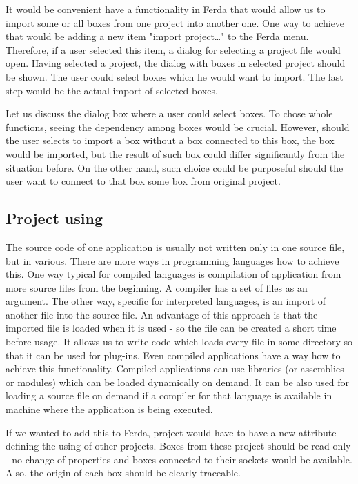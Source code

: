 \documentclass[a4paper,12pt]{book}
\begin{document}
It would be convenient have a functionality in Ferda that would allow us to import some or all boxes from one project into another one. One way to achieve that would be adding a new item "import project\dots" to the Ferda menu. Therefore, if a user selected this item, a dialog for selecting a project file would open. Having selected a project, the dialog with boxes in selected project should be shown. The user could select boxes which he would want to import. The last step would be the actual import of selected boxes.

Let us discuss the dialog box where a user could select boxes. To chose whole functions, seeing the dependency among boxes would be crucial. However, should the user selects to import a box without a box connected to this box, the box would be imported, but the result of such box could differ significantly from the situation before. On the other hand, such choice could be purposeful should the user want to connect to that box some box from original project.


\subsection{Project using}
The source code of one application is usually not written only in one source file, but in various. There are more ways in programming languages how to achieve this. One way typical for compiled languages is compilation of application from more source files from the beginning. A compiler has a set of files as an argument. The other way, specific for interpreted languages, is an import of another file into the source file. An advantage of this approach is that the imported file is loaded when it is used - so the file can be created a short time before usage. It allows us to write code which loads every file in some directory so that it can be used for plug-ins. Even compiled applications have a way how to achieve this functionality. Compiled applications can use libraries (or assemblies or modules) which can be loaded dynamically on demand. It can be also used for loading a source file on demand if a compiler for that language is available in machine where the application is being executed.

If we wanted to add this to Ferda, project would have to have a new attribute defining the using of other projects. Boxes from these project should be read only - no change of properties and boxes connected to their sockets would be available. Also, the origin of each box should be clearly traceable.
\end{document}
